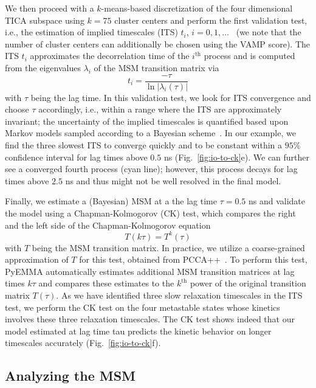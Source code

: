 \documentclass[9pt,tutorial]{livecoms}
\begin{document}
We then proceed with a $k$-means-based discretization of the four dimensional TICA subspace using $k=75$ cluster centers and perform the first validation test, i.e., the estimation of implied timescales (ITS) $t_i$, $i=0, 1,\dots$~\cite{swope-its}
(we note that the number of cluster centers can additionally be chosen using the VAMP score).
The ITS $t_i$ approximates the decorrelation time of the $i^\textrm{th}$ process and is computed from the eigenvalues $\lambda_i$ of the MSM transition matrix via
\begin{equation}
\label{eq:its}
t_i = \frac{-\tau}{\ln\left|\lambda_i(\tau)\right|}
\end{equation}
with $\tau$ being the lag time.
In this validation test, we look for ITS convergence and choose $\tau$ accordingly, i.e., within a range where the ITS are approximately invariant; the uncertainty of the implied timescales is quantified based upon Markov models sampled according to a Bayesian scheme~\cite{ben-rev-msm,noe-tmat-sampling}.
In our example, we find the three slowest ITS to converge quickly and to be constant within a $95\%$ confidence interval for lag times above $0.5$ ns (Fig.~\ref{fig:io-to-ck}e).
We can further see a converged fourth process (cyan line); however, this process decays for lag times above $2.5$ ns and thus might not be well resolved in the final model.

Finally, we estimate a (Bayesian) MSM at a the lag time $\tau=0.5$ ns and validate the model using a Chapman-Kolmogorov (CK) test, which compares the right and the left side of the Chapman-Kolmogorov equation
\begin{equation}
\label{eq:ck}
T(k \tau) = T^k(\tau)
\end{equation}
with $T$ being the MSM transition matrix.
In practice, we utilize a coarse-grained approximation of $T$ for this test, obtained from PCCA++~\cite{pcca++}.
To perform this test, PyEMMA automatically estimates additional MSM transition matrices at lag times $k \tau$ and compares these estimates to the $k^\textrm{th}$ power of the original transition matrix $T(\tau)$.
As we have identified three slow relaxation timescales in the ITS test,
we perform the CK test on the four metastable states whose kinetics involves these three relaxation timescales.
The CK test shows indeed that our model estimated at lag time tau predicts the kinetic behavior on longer timescales accurately (Fig.~\ref{fig:io-to-ck}f).

\subsection{Analyzing the MSM}
\end{document}
